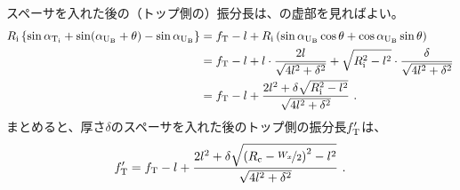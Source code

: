 スペーサを入れた後の（トップ側の）振分長は、の虚部を見ればよい。
\begin{align*}
  R_\text i\left\{\sin\alpha_{\text T_\text i} + \sin(\alpha_{\text U_\text B} + \theta) - \sin\alpha_{\text U_\text B}\right\}
  &= f_\text T - l +R_\text i\left(\sin\alpha_{\text U_\text B}\cos\theta + \cos\alpha_{\text U_\text B}\sin\theta\right)\\
  &= f_\text T - l +l\cdot\frac{2l}{\sqrt{4l^2+\delta^2}}+\sqrt{R_\text i^2-l^2}\cdot\frac{\delta}{\sqrt{4l^2+\delta^2}}\\
  &= f_\text T - l +\frac{2l^2+\delta\sqrt{R_\text i^2-l^2}}{\sqrt{4l^2+\delta^2}}~.
\end{align*}
まとめると、厚さ$\delta$のスペーサを入れた後のトップ側の振分長$f'_\text T$は、
\begin{align*}
  f'_\text T = f_\text T - l +\frac{2l^2+\delta\sqrt{\left(R_\text c-\nicefrac{W_x}2\right)^2-l^2}}{\sqrt{4l^2+\delta^2}}~.
\end{align*}



